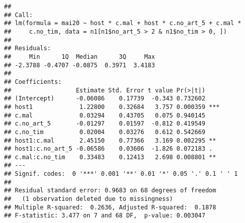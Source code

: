 \documentclass[]{article}
\newenvironment{Shaded}{\begin{snugshade}}{\end{snugshade}}
\newcommand{\KeywordTok}[1]{\textcolor[rgb]{0.13,0.29,0.53}{\textbf{#1}}}
\newcommand{\DataTypeTok}[1]{\textcolor[rgb]{0.13,0.29,0.53}{#1}}
\newcommand{\DecValTok}[1]{\textcolor[rgb]{0.00,0.00,0.81}{#1}}
\newcommand{\StringTok}[1]{\textcolor[rgb]{0.31,0.60,0.02}{#1}}
\newcommand{\OperatorTok}[1]{\textcolor[rgb]{0.81,0.36,0.00}{\textbf{#1}}}
\newcommand{\NormalTok}[1]{#1}
\begin{document}
\begin{verbatim}
## 
## Call:
## lm(formula = mai20 ~ host * c.mal + host * c.no_art_5 + c.mal * 
##     c.no_tim, data = n1[n1$no_art_5 > 2 & n1$no_tim > 0, ])
## 
## Residuals:
##     Min      1Q  Median      3Q     Max 
## -2.3788 -0.4707 -0.0875  0.3971  3.4183 
## 
## Coefficients:
##                  Estimate Std. Error t value Pr(>|t|)    
## (Intercept)      -0.06086    0.17739  -0.343 0.732602    
## host1             1.22800    0.32684   3.757 0.000359 ***
## c.mal             0.03294    0.43705   0.075 0.940145    
## c.no_art_5       -0.01297    0.01597  -0.812 0.419549    
## c.no_tim          0.02004    0.03276   0.612 0.542669    
## host1:c.mal       2.45150    0.77366   3.169 0.002295 ** 
## host1:c.no_art_5 -0.06586    0.03606  -1.826 0.072183 .  
## c.mal:c.no_tim    0.33483    0.12413   2.698 0.008801 ** 
## ---
## Signif. codes:  0 '***' 0.001 '**' 0.01 '*' 0.05 '.' 0.1 ' ' 1
## 
## Residual standard error: 0.9683 on 68 degrees of freedom
##   (1 observation deleted due to missingness)
## Multiple R-squared:  0.2636, Adjusted R-squared:  0.1878 
## F-statistic: 3.477 on 7 and 68 DF,  p-value: 0.003047
\end{verbatim}

\begin{Shaded}
\end{Shaded}
\end{document}
